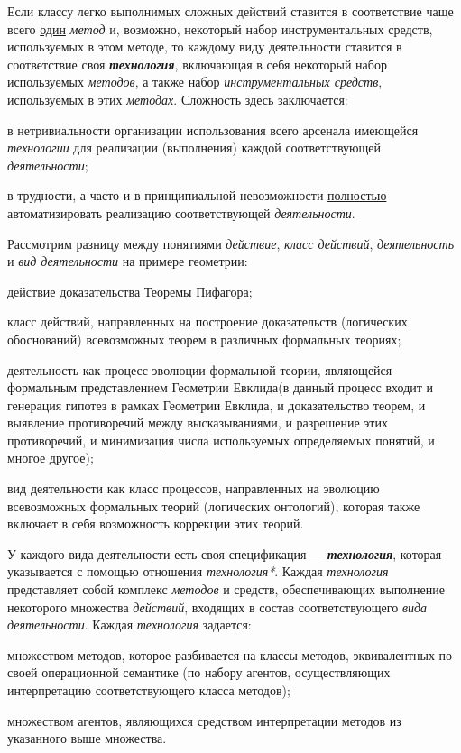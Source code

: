 Если классу легко выполнимых сложных действий ставится в соответствие чаще всего \uline{один} \textit{метод} и, возможно, некоторый набор инструментальных средств, используемых в этом методе, то каждому виду деятельности ставится в соответствие своя \textbf{\textit{технология}}, включающая в себя некоторый набор используемых \textit{методов}, а также набор \textit{инструментальных средств}, используемых в этих \textit{методах}.
Сложность здесь заключается:
\begin{textitemize}
	\item в нетривиальности организации использования всего арсенала имеющейся \textit{технологии} для реализации (выполнения) каждой соответствующей \textit{деятельности};
	\item в трудности, а часто и в принципиальной невозможности \uline{полностью} автоматизировать реализацию соответствующей \textit{деятельности}.
\end{textitemize}

Рассмотрим разницу между понятиями \textit{действие}, \textit{класс действий}, \textit{деятельность} и \textit{вид деятельности} на примере геометрии:
\begin{textitemize}
	\item действие доказательства Теоремы Пифагора;
	\item класс действий, направленных на построение доказательств (логических обоснований) всевозможных теорем в различных формальных теориях;
	\item деятельность как процесс эволюции формальной теории, являющейся формальным представлением Геометрии Евклида(в данный процесс входит и генерация гипотез в рамках Геометрии Евклида, и доказательство теорем, и выявление противоречий между высказываниями, и разрешение этих противоречий, и минимизация числа используемых определяемых понятий, и многое другое);
	\item вид деятельности как класс процессов, направленных на эволюцию всевозможных формальных теорий (логических онтологий), которая также включает в себя возможность коррекции этих теорий.
\end{textitemize}

У каждого вида деятельности есть своя спецификация --- \textbf{\textit{технология}}, которая указывается с помощью отношения \textit{технология*}. Каждая \textit{технология} представляет собой комплекс \textit{методов} и средств, обеспечивающих выполнение некоторого множества \textit{действий}, входящих в состав соответствующего \textit{вида деятельности}.
Каждая \textit{технология} задается:
\begin{textitemize}
	\item множеством методов, которое разбивается на классы методов, эквивалентных по своей операционной семантике (по набору агентов, осуществляющих интерпретацию соответствующего класса методов);
	\item множеством агентов, являющихся средством интерпретации методов из указанного выше множества.
\end{textitemize}

